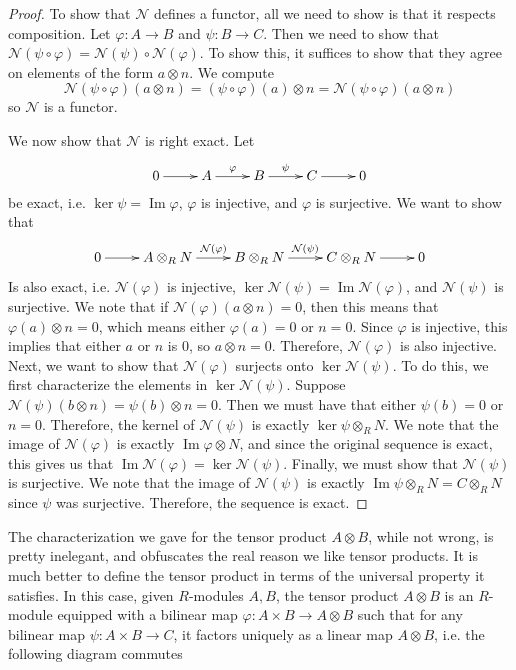 \documentclass[psamsfonts]{amsart}
\theoremstyle{definition}
\theoremstyle{remark}
\DeclareMathOperator{\im}{Im}
\begin{document}
\begin{proof}
To show that $\mathcal{N}$ defines a functor, all we need to show is that it respects composition. Let $\varphi: A \to B$ and $\psi: B \to C$. Then we need to show that $\mathcal{N}(\psi \circ \varphi) = \mathcal{N}(\psi) \circ \mathcal{N}(\varphi)$. To show this, it suffices to show that they agree on elements of the form $a \otimes n$. We compute
$$ \mathcal{N}(\psi \circ \varphi)(a \otimes n) = (\psi \circ \varphi)(a) \otimes n = \mathcal{N}(\psi \circ \varphi)(a \otimes n) $$
so $\mathcal{N}$ is a functor.

We now show that $\mathcal{N}$ is right exact. Let 
$$\xymatrix{
0 \ar[r] & A \ar[r]^\varphi & B \ar[r]^\psi & C \ar[r] & 0
}$$
be exact, i.e. $\ker\psi = \im\varphi$, $\varphi$ is injective, and $\varphi$ is surjective. We want to show that 
$$\xymatrix{
0 \ar[r] & A \otimes_R N \ar[r]^{\mathcal{N}(\varphi)} & B \otimes_R N \ar[r]^{\mathcal{N}(\psi)} & C \otimes_R N \ar[r] & 0
}$$
Is also exact, i.e. $\mathcal{N}(\varphi)$ is injective, $\ker\mathcal{N}(\psi) = \im\mathcal{N}(\varphi)$, and $\mathcal{N}(\psi)$ is surjective. We note that if $\mathcal{N}(\varphi)(a \otimes n) = 0$, then this means that $\varphi(a) \otimes n = 0$, which means either $\varphi(a) = 0$ or $n = 0$. Since $\varphi$ is injective, this implies that either $a$ or $n$ is $0$, so $a \otimes n = 0$. Therefore, $\mathcal{N}(\varphi)$ is also injective. Next, we want to show that $\mathcal{N}(\varphi)$ surjects onto $\ker\mathcal{N}(\psi)$. To do this, we first characterize the elements in $\ker\mathcal{N}(\psi)$. Suppose $\mathcal{N}(\psi)(b \otimes n) = \psi(b) \otimes n = 0$. Then we must have that either $\psi(b) = 0$ or $n = 0$. Therefore, the kernel of $\mathcal{N}(\psi)$ is exactly $\ker\psi \otimes_R N$. We note that the image of $\mathcal{N}(\varphi)$ is exactly $\im\varphi \otimes N$, and since the original sequence is exact, this gives us that $\im\mathcal{N}(\varphi) = \ker\mathcal{N}(\psi)$. Finally, we must show that $\mathcal{N}(\psi)$ is surjective.  We note that the image of $\mathcal{N}(\psi)$ is exactly $\im\psi \otimes_R N = C \otimes_R N$ since $\psi$ was surjective. Therefore, the sequence is exact.
\end{proof}
The characterization we gave for the tensor product $A \otimes B$, while not wrong, is pretty inelegant, and obfuscates the real reason we like tensor products. It is much better to define the tensor product in terms of the universal property it satisfies. In this case, given $R$-modules $A,B$, the tensor product $A \otimes B$ is an $R$-module equipped with a bilinear map $\varphi: A\times B \to A \otimes B$  such that for any bilinear map $\psi: A \times B \to C$, it factors uniquely as a linear map $A \otimes B$, i.e. the following diagram commutes
\end{document}
